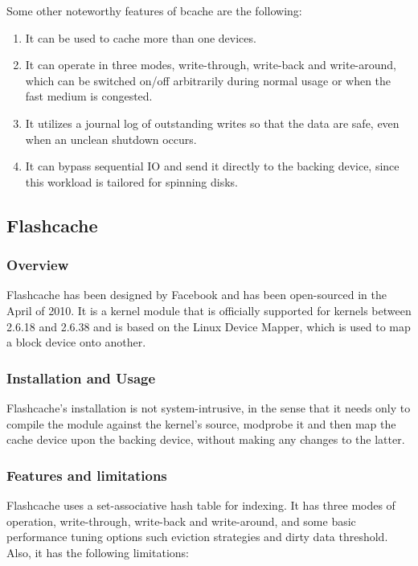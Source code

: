 Some other noteworthy features of bcache are the following:

\begin{enumerate}
	\item It can be used to cache more than one devices.
	\item It can operate in three modes, write-through, write-back and 
		write-around, which can be switched on/off arbitrarily during normal 
		usage or when the fast medium is congested.
	\item It utilizes a journal log of outstanding writes so that the data are 
		safe, even when an unclean shutdown occurs.
	\item It can bypass sequential IO and send it directly to the backing 
		device, since this workload is tailored for spinning disks.
\end{enumerate}

\subsection{Flashcache}

\subsubsection{Overview}

Flashcache has been designed by Facebook and has been open-sourced in the April 
of 2010. It is a kernel module that is officially supported for kernels between  
2.6.18 and 2.6.38 and is based on the Linux Device Mapper, which is used to map 
a block device onto another.

\subsubsection{Installation and Usage}

Flashcache's installation is not system-intrusive, in the sense that it needs 
only to compile the module against the kernel's source, modprobe it and then 
map the cache device upon the backing device, without making any changes to the 
latter.

\subsubsection{Features and limitations}

Flashcache uses a set-associative hash table for indexing. It has three modes 
of operation, write-through, write-back and write-around, and some basic 
performance tuning options such eviction strategies and dirty data threshold.  
Also, it has the following limitations:

